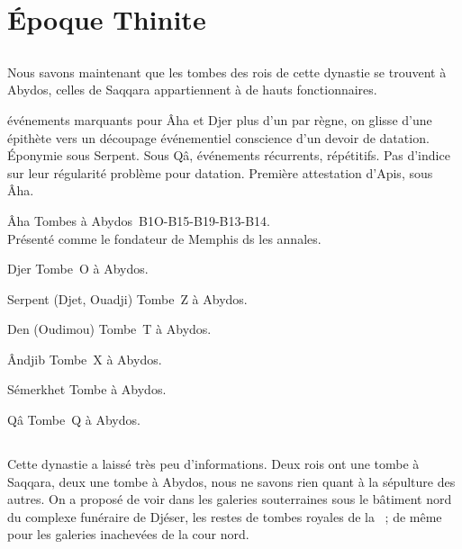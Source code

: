 \section{Époque Thinite}


\subsection{\texorpdfstring{}{Ie dynastie}}

Nous savons maintenant que les tombes des rois de cette dynastie 
se trouvent à Abydos, celles de Saqqara appartiennent à de hauts 
fonctionnaires.

événements marquants pour Âha et Djer \donc{} plus d'un par règne, 
on glisse d'une épithète vers un découpage événementiel \donc{} 
conscience d'un devoir de datation.
Éponymie sous Serpent.
Sous Qâ, événements récurrents, répétitifs.
Pas d'indice sur leur régularité \donc{} problème pour datation.
Première attestation d'Apis, sous Âha.

\begin{listerois}
  \item [Âha] Tombes à Abydos~B1O-B15-B19-B13-B14.\\
        Présenté comme le fondateur de Memphis ds les annales.
  \item [Djer] Tombe~O à Abydos.
  \item [Serpent (Djet, Ouadji)] Tombe~Z à Abydos.
  \item [Den (Oudimou)] Tombe~T à Abydos.
  \item [Ândjib] Tombe~X à Abydos.
  \item [Sémerkhet] Tombe à Abydos.
  \item [Qâ] Tombe~Q à Abydos.
\end{listerois}

\subsection{\texorpdfstring{}{IIe dynastie}}

Cette dynastie a laissé très peu d'informations. Deux rois ont une 
tombe à Saqqara, deux une tombe à Abydos, nous ne savons rien quant à 
la sépulture des autres. On a proposé de voir dans les galeries 
souterraines sous le bâtiment nord du complexe funéraire de Djéser, 
les restes de tombes royales de la~ ; de même pour les 
galeries inachevées de la cour nord.

